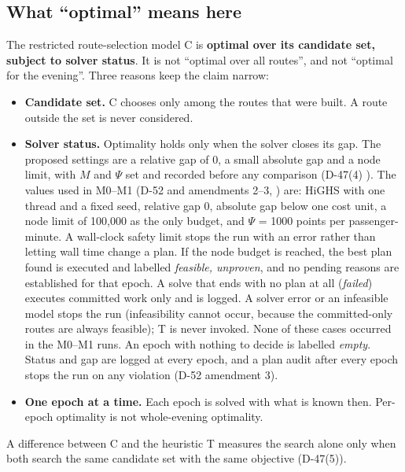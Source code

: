 \documentclass[11pt,letterpaper]{article}
\newcommand{\status}[2]{{\setlength{\fboxsep}{1.1pt}\fcolorbox{#1}{white}{\textcolor{#1}{\sffamily\scriptsize\strut #2}}}}
\newcommand{\Provisional}{\status{cProvisional}{provisional}}
\newcommand{\Proposed}{\status{cProposed}{proposed, not approved}}
\newcommand{\D}[1]{D-#1}
\newenvironment{callout}[1][]{%
  \def\FrameCommand{\fboxsep=8pt\colorbox{shade}}%
  \MakeFramed{\advance\hsize-\width\FrameRestore}%
  \ifx\relax#1\relax\else{\sffamily\bfseries\color{heading}#1}\par\smallskip\fi}%
  {\endMakeFramed}
\begin{document}
\subsection{What ``optimal'' means here}
\begin{callout}
The restricted route-selection model C is \textbf{optimal over its candidate set, subject to solver status}. It is not ``optimal over all routes'', and not ``optimal for the evening''.
\end{callout}
Three reasons keep the claim narrow:
\begin{itemize}
\item \textbf{Candidate set.} C chooses only among the routes that were built. A route outside the set is never considered.
\item \textbf{Solver status.} Optimality holds only when the solver closes its gap. The proposed settings are a relative gap of 0, a small absolute gap and a node limit, with $M$ and $\Psi$ set and recorded before any comparison (\D{47}(4) \Proposed). The values used in M0--M1 (\D{52} and amendments 2--3, \Provisional) are: HiGHS with one thread and a fixed seed, relative gap 0, absolute gap below one cost unit, a node limit of 100,000 as the only budget, and $\Psi$ = 1000 points per passenger-minute. A wall-clock safety limit stops the run with an error rather than letting wall time change a plan. If the node budget is reached, the best plan found is executed and labelled \emph{feasible, unproven}, and no pending reasons are established for that epoch. A solve that ends with no plan at all (\emph{failed}) executes committed work only and is logged. A solver error or an infeasible model stops the run (infeasibility cannot occur, because the committed-only routes are always feasible); T is never invoked. None of these cases occurred in the M0--M1 runs. An epoch with nothing to decide is labelled \emph{empty}. Status and gap are logged at every epoch, and a plan audit after every epoch stops the run on any violation (\D{52} amendment 3).
\item \textbf{One epoch at a time.} Each epoch is solved with what is known then. Per-epoch optimality is not whole-evening optimality.
\end{itemize}
A difference between C and the heuristic T measures the search alone only when both search the same candidate set with the same objective (\D{47}(5)).
\end{document}
